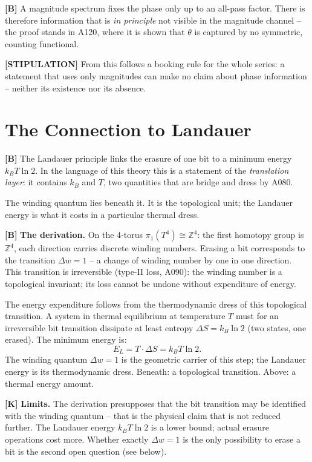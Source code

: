 \textbf{[B]} A magnitude spectrum fixes the phase only up to an all-pass factor.
There is therefore information that is \emph{in principle} not visible in the
magnitude channel -- the proof stands in A120, where it is shown that $\theta$
is captured by no symmetric, counting functional.

\textbf{[STIPULATION]} From this follows a booking rule for the whole series: a
statement that uses only magnitudes can make no claim about phase information --
neither its existence nor its absence.

\section{The Connection to Landauer}

\textbf{[B]} The Landauer principle links the erasure of one bit to a minimum
energy $k_B T\ln 2$. In the language of this theory this is a statement of the
\emph{translation layer}: it contains $k_B$ and $T$, two quantities that are
bridge and dress by A080.

The winding quantum lies beneath it. It is the topological unit; the Landauer
energy is what it costs in a particular thermal dress.

\textbf{[B]} \textbf{The derivation.} On the 4-torus
$\pi_1(T^4)\cong\mathbb Z^4$: the first homotopy group is $\mathbb Z^4$, each
direction carries discrete winding numbers. Erasing a bit corresponds to the
transition $\Delta w = 1$ -- a change of winding number by one in one direction.
This transition is irreversible (type-II loss, A090): the winding number is a
topological invariant; its loss cannot be undone without expenditure of energy.

The energy expenditure follows from the thermodynamic dress of this topological
transition. A system in thermal equilibrium at temperature $T$ must for an
irreversible bit transition dissipate at least entropy $\Delta S = k_B \ln 2$
(two states, one erased). The minimum energy is:
\[
  E_L = T\cdot\Delta S = k_B T\ln 2.
\]
The winding quantum $\Delta w=1$ is the geometric carrier of this step; the
Landauer energy is its thermodynamic dress. Beneath: a topological transition.
Above: a thermal energy amount.

\textbf{[K]} \textbf{Limits.} The derivation presupposes that the bit transition
may be identified with the winding quantum -- that is the physical claim that is
not reduced further. The Landauer energy $k_BT\ln2$ is a lower bound; actual
erasure operations cost more. Whether exactly $\Delta w=1$ is the only possibility
to erase a bit is the second open question (see below).

